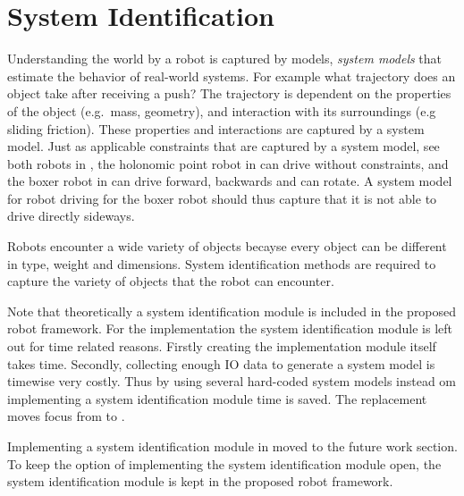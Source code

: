 \section{System Identification}%
\label{sec:sys_iden}
Understanding the world by a robot is captured by models, \textit{system models} that estimate the behavior of real-world systems. For example what trajectory does an object take after receiving a push? The trajectory is dependent on the properties of the object (e.g.~mass, geometry), and interaction with its surroundings (e.g sliding friction). These properties and interactions are captured by a system model. Just as applicable constraints that are captured by a system model, see both robots in , the holonomic point robot in  can drive without constraints, and the boxer robot in  can drive forward, backwards and can rotate. A system model for robot driving for the boxer robot should thus capture that it is not able to drive directly sideways.\bs

Robots encounter a wide variety of objects becayse every object can be different in type, weight and dimensions. System identification methods are required to capture the variety of objects that the robot can encounter.\bs



Note that theoretically a system identification module is included in the proposed robot framework. For the implementation the system identification module is left out for time related reasons. Firstly creating the implementation module itself takes time. Secondly, collecting enough \ac{IO} data to generate a system model is timewise very costly. Thus by using several hard-coded system models instead om implementing a system identification module time is saved. The replacement moves focus from  to .\bs

Implementing a system identification module in moved to the future work section. To keep the option of implementing the system identification module open, the system identification module is kept in the proposed robot framework.\bs
